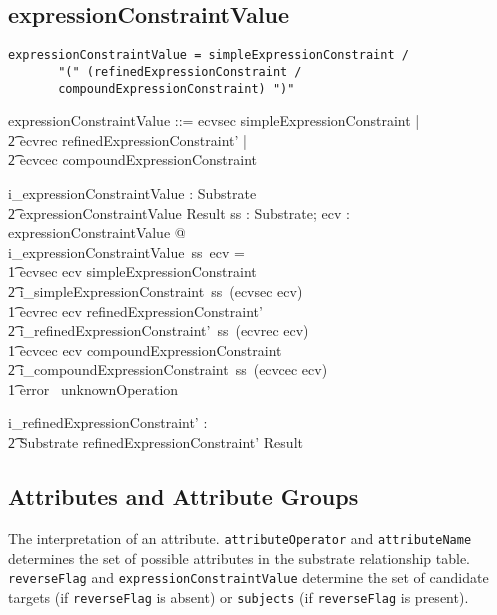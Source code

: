 \documentclass{article}
\def\spec#1{{\tt #1}}
\begin{document}
\subsection{expressionConstraintValue}
\begin{verbatim}
expressionConstraintValue = simpleExpressionConstraint / 
       "(" (refinedExpressionConstraint / 			
       compoundExpressionConstraint) ")"
\end{verbatim}

\begin{zed}
expressionConstraintValue ::= ecvsec \ldata simpleExpressionConstraint \rdata | \\
\t2 ecvrec \ldata refinedExpressionConstraint' \rdata | \\
\t2 ecvcec \ldata compoundExpressionConstraint \rdata \\
[refinedExpressionConstraint']
\end{zed}
\begin{gendef}
   i\_expressionConstraintValue : Substrate \fun \\
\t2 expressionConstraintValue \fun Result
\where
   \forall ss : Substrate; ecv : expressionConstraintValue @  \\
   i\_expressionConstraintValue~ss~ecv = \\
\t1 \IF ecvsec \inv ecv \in simpleExpressionConstraint \\
\t2 \THEN i\_simpleExpressionConstraint~ss~(ecvsec \inv ecv) \\
\t1 \ELSE \IF ecvrec \inv ecv \in refinedExpressionConstraint' \\ 
\t2 \THEN i\_refinedExpressionConstraint'~ss~(ecvrec \inv ecv) \\
\t1 \ELSE \IF ecvcec \inv ecv \in compoundExpressionConstraint \\ 
\t2 \THEN i\_compoundExpressionConstraint~ss~(ecvcec \inv ecv) \\
\t1 \ELSE error~ unknownOperation
\end{gendef}

\begin{gendef}
   i\_refinedExpressionConstraint' : \\
\t2 Substrate \pfun refinedExpressionConstraint' \pfun Result
\end{gendef}




\subsection{Attributes and Attribute Groups}
The interpretation of an attribute.  \spec{attributeOperator} and \spec{attributeName}
determines the set of possible attributes in the substrate relationship table.  \spec{reverseFlag} and
\spec{expressionConstraintValue} determine the set of candidate targets (if \spec{reverseFlag}
is absent) or \spec{subjects} (if \spec{reverseFlag} is present).
\end{document}
